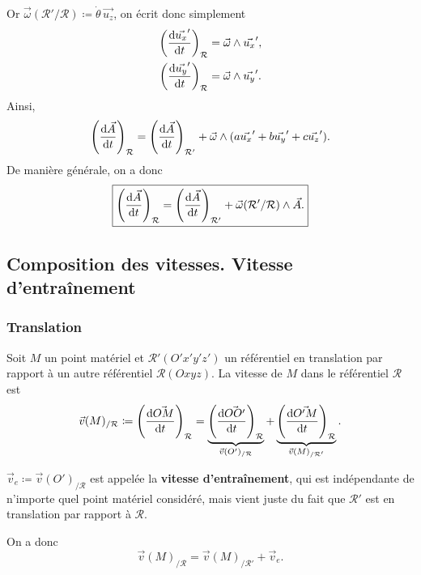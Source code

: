         Or $\vec{\omega}(\mathcal{R}'/\mathcal{R})\coloneqq\dot{\theta}\,\vec{u_z}$, on écrit donc simplement
        \begin{equation*}
            \begin{aligned}
                \left(\frac{\mathrm{d}\vec{u_x}'}{\mathrm{d} t}\right)_{\mathcal{R}} &=\vec{\omega}\wedge\vec{u_x}',\\
                \left(\frac{\mathrm{d}\vec{u_y}'}{\mathrm{d} t}\right)_{\mathcal{R}} &=\vec{\omega}\wedge\vec{u_y}'.
            \end{aligned}
        \end{equation*}
        Ainsi,
        \begin{equation*}
            \left(\frac{\mathrm{d}\vec{A}}{\mathrm{d} t}\right)_{\mathcal{R}}=\left(\frac{\mathrm{d}\vec{A}}{\mathrm{d} t}\right)_{\mathcal{R}'}+\vec{\omega}\wedge(a\vec{u_x}'+b\vec{u_y}'+c\vec{u_z}').
        \end{equation*}
        De manière générale, on a donc 
        \begin{equation*}
            \boxed{
                \left(\frac{\mathrm{d}\vec{A}}{\mathrm{d} t}\right)_{\mathcal{R}}=\left(\frac{\mathrm{d}\vec{A}}{\mathrm{d} t}\right)_{\mathcal{R}'}+\vec{\omega}(\mathcal{R}'/\mathcal{R})\wedge\vec{A}.
            }
        \end{equation*}
    
    \subsection{Composition des vitesses. Vitesse d'entraînement}
        \subsubsection{Translation}

            Soit $M$ un point matériel et $\mathcal{R}'(O'x'y'z')$ un référentiel en translation par rapport à un autre référentiel $\mathcal{R}(Oxyz)$. La vitesse de $M$ dans le référentiel $\mathcal{R}$ est
            \begin{equation*}
                \vec{v}(M)_{/\mathcal{R}}\coloneqq\left(\frac{\mathrm{d}\vec{OM}}{\mathrm{d} t}\right)_{\mathcal{R}}=\underbrace{\left(\frac{\mathrm{d} \vec{OO'}}{\mathrm{d} t}\right)_{\mathcal{R}}}_{\vec{v}(O')_{/\mathcal{R}}}+\underbrace{\left(\frac{\mathrm{d}\vec{O'M}}{\mathrm{d} t}\right)_{\mathcal{R}}}_{\vec{v}(M)_{/\mathcal{R}'}}.
            \end{equation*}
            \begin{definition}
                $\vec{v}_e\coloneqq\vec{v}(O')_{/\mathcal{R}}$ est appelée la \textbf{vitesse d'entraînement}, qui est indépendante de n'importe quel point matériel considéré, mais vient juste du fait que $\mathcal{R}'$ est en translation par rapport à $\mathcal{R}$.
            \end{definition}
            On a donc
            \begin{equation*}
                \boxed{
                    \vec{v}(M)_{/\mathcal{R}}=\vec{v}(M)_{/\mathcal{R}'}+\vec{v}_e.
                }
            \end{equation*}

